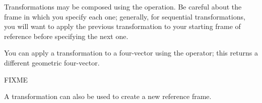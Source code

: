 Transformations may be composed using the \code{\*} operation.  Be
careful about the frame in which you specify each one; generally, for
sequential transformations, you will want to apply the previous
transformation to your starting frame of reference before specifying the
next one.

You can apply a transformation to a four-vector using the \code{\^}
operator; this returns a different geometric four-vector.  

FIXME

A transformation can also be used to create a new reference frame.

